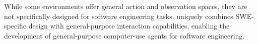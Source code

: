 While some environments offer general action and observation spaces, they are not specifically designed for software engineering tasks. \Ours{} uniquely combines SWE-specific design with general-purpose interaction capabilities, enabling the development of general-purpose computer-use agents for software engineering.

